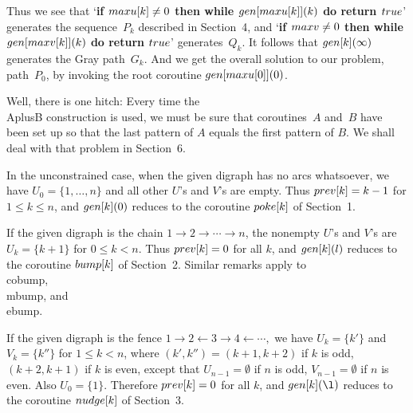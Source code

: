 Thus we see that `{\bf if $\\{maxu}[k]\ne0$ then while
$\\{gen}[\\{maxu}[k]](k)$ do return $\\{true}$}'
generates the sequence~$P_k$ described in
Section~4, and `{\bf if $\\{maxv}\ne0$ then while $\\{gen}[\\{maxv}[k]]
(k)$ do return $\\{true}$}' generates~$Q_k$.  It follows
that $\\{gen}[k](\infty)$ generates the Gray path~$G_k$.
And we get the overall solution to our problem, path~$P_0$,
by invoking the root coroutine $\\{gen}[\\{maxu}[0]](0)$.

Well, there is one hitch:  Every time the \\{AplusB}
construction is used, we must be sure that coroutines~$A$
and~$B$ have been set up so that the last pattern of 
$A$ equals the first pattern of $B$.  We shall deal
with that problem in Section~6.

In the unconstrained case, when the given digraph has no arcs
whatsoever, we have 
$U_0=\{1,\ldots,n\}$ and all other $U$'s and $V$'s are
empty.  Thus $\\{prev}[k]=k-1$ for 
$1\le k\le n$, and $\\{gen}[k](0)$ reduces to the coroutine
$\\{poke}[k]$ of Section~1.

If the given digraph is the chain $1\to2\to\cdots\to n$, the
nonempty $U$'s and $V$'s are $U_k=\{k+1\}$ for $0\le k<n$.
Thus $\\{prev}[k]=0$ for all $k$, and $\\{gen}[k](l)$
reduces to the coroutine $\\{bump}[k]$ of Section~2.
Similar remarks apply to \\{cobump}, \\{mbump}, and \\{ebump}.

If the given digraph is the fence
$1\to2\gets3\to4\gets\cdots,$ we have $U_k=\{k'\}$ and
$V_k=\{k''\}$ for $1\le k<n$, where $(k',k'')=(k+1,k+2)$ if
$k$ is odd, $(k+2,k+1)$ if $k$ is even, except that
$U_{n-1}=\emptyset$ if $n$ is odd, $V_{n-1}=\emptyset$ if
$n$ is even.  Also $U_0=\{1\}$.  Therefore $\\{prev}[k]=0$ for
all $k$, and $\\{gen}[k](\l)$ reduces to the coroutine
$\\{nudge}[k]$ of Section~3.

